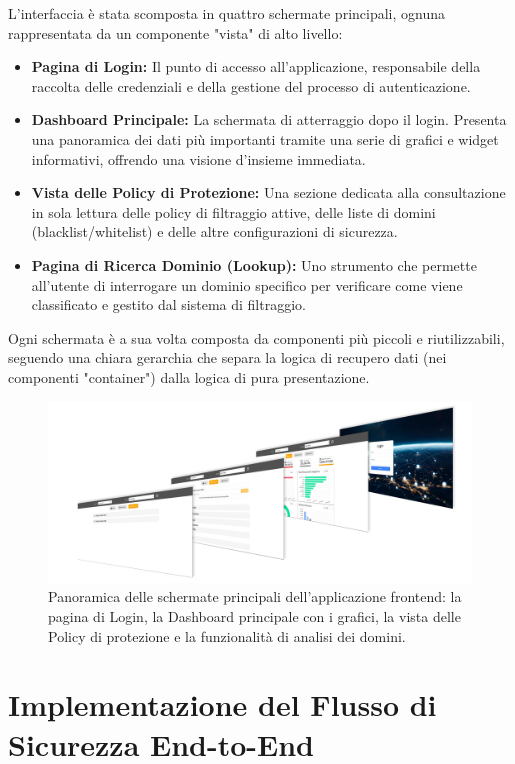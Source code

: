 \documentclass[12pt,a4paper,openright,twoside]{book}
\begin{document}
L'interfaccia è stata scomposta in quattro schermate principali, ognuna rappresentata da un componente "vista" di alto livello:
\begin{itemize}
    \item \textbf{Pagina di Login:} Il punto di accesso all'applicazione, responsabile della raccolta delle credenziali e della gestione del processo di autenticazione.
    \item \textbf{Dashboard Principale:} La schermata di atterraggio dopo il login. Presenta una panoramica dei dati più importanti tramite una serie di grafici e widget informativi, offrendo una visione d'insieme immediata.
    \item \textbf{Vista delle Policy di Protezione:} Una sezione dedicata alla consultazione in sola lettura delle policy di filtraggio attive, delle liste di domini (blacklist/whitelist) e delle altre configurazioni di sicurezza.
    \item \textbf{Pagina di Ricerca Dominio (Lookup):} Uno strumento che permette all'utente di interrogare un dominio specifico per verificare come viene classificato e gestito dal sistema di filtraggio.
\end{itemize}
Ogni schermata è a sua volta composta da componenti più piccoli e riutilizzabili, seguendo una chiara gerarchia che separa la logica di recupero dati (nei componenti "container") dalla logica di pura presentazione.

\begin{figure}[H]
    \centering
    \includegraphics[width=\textwidth]{figures/slideshow.png}
    \caption{Panoramica delle schermate principali dell'applicazione frontend: la pagina di Login, la Dashboard principale con i grafici, la vista delle Policy di protezione e la funzionalità di analisi dei domini.}
    \label{fig:ui_screens}
\end{figure}

\section{Implementazione del Flusso di Sicurezza End-to-End}
\label{sec:impl_security}
\end{document}
